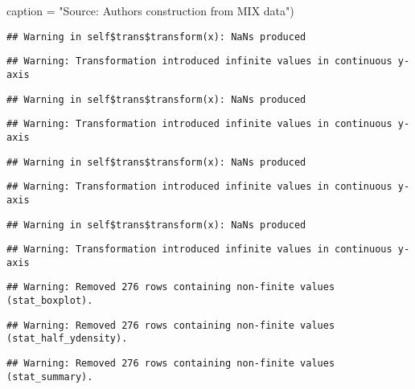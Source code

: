 \documentclass[a4paper,nobind]{templates/ociamthesis}
\newenvironment{Shaded}{\begin{snugshade}}{\end{snugshade}}
\newcommand{\AttributeTok}[1]{\textcolor[rgb]{0.77,0.63,0.00}{#1}}
\newcommand{\NormalTok}[1]{#1}
\newcommand{\StringTok}[1]{\textcolor[rgb]{0.31,0.60,0.02}{#1}}
\renewenvironment{Shaded}
{
  \vspace{10pt}%
  \begin{snugshade}%
}{%
  \end{snugshade}%
  \vspace{8pt}%
}
\begin{document}
\begin{landscape}
\begin{Shaded}
\begin{Highlighting}[]
                  \AttributeTok{caption =} \StringTok{"Source: Authors\textquotesingle{} construction from MIX data"}\NormalTok{)}
\end{Highlighting}
\end{Shaded}

\begin{verbatim}
## Warning in self$trans$transform(x): NaNs produced
\end{verbatim}

\begin{verbatim}
## Warning: Transformation introduced infinite values in continuous y-axis
\end{verbatim}

\begin{verbatim}
## Warning in self$trans$transform(x): NaNs produced
\end{verbatim}

\begin{verbatim}
## Warning: Transformation introduced infinite values in continuous y-axis
\end{verbatim}

\begin{verbatim}
## Warning in self$trans$transform(x): NaNs produced
\end{verbatim}

\begin{verbatim}
## Warning: Transformation introduced infinite values in continuous y-axis
\end{verbatim}

\begin{verbatim}
## Warning in self$trans$transform(x): NaNs produced
\end{verbatim}

\begin{verbatim}
## Warning: Transformation introduced infinite values in continuous y-axis
\end{verbatim}

\begin{verbatim}
## Warning: Removed 276 rows containing non-finite values (stat_boxplot).
\end{verbatim}

\begin{verbatim}
## Warning: Removed 276 rows containing non-finite values (stat_half_ydensity).
\end{verbatim}

\begin{verbatim}
## Warning: Removed 276 rows containing non-finite values (stat_summary).
\end{verbatim}


\end{landscape}
\end{document}
